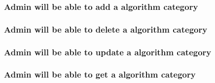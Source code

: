 \subsubsection {Admin will be able to add a algorithm category}
\subsubsection {Admin will be able to delete a algorithm category}
\subsubsection {Admin will be able to update a algorithm category}
\subsubsection {Admin will be able to get a algorithm category}







